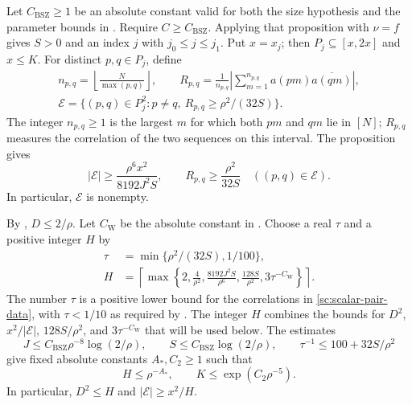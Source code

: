 \documentclass[twoside]{aomart}
\makeatletter
\theoremstyle{paperplain}
\theoremstyle{paperdefinition}
\renewenvironment{proof}[1][\proofname]{\par\pushQED{\qed}%
  \normalfont\topsep6\p@\@plus3\p@\relax\trivlist
  \item[\hskip\labelsep\itshape #1\@addpunct{.}]\ignorespaces
}{\popQED\endtrivlist\@endpefalse}
\numberwithin{equation}{section}
\makeatother
\begin{document}
\begin{proof}
Let $C_{\mathrm{BSZ}}\ge1$ be an absolute constant valid for both
the size hypothesis and the parameter bounds in .
Require $C\ge C_{\mathrm{BSZ}}$. Applying that proposition with
$\nu=f$ gives $S>0$ and an index $j$ with $j_0\le j\le j_1$.
Put $x=x_j$; then $P_j\subseteq[x,2x]$ and $x\le K$.
For distinct $p,q\in P_j$, define
\begin{equation*}
 \begin{gathered}
 n_{p,q}=\left\lfloor\frac{N}{\max(p,q)}\right\rfloor,\qquad
 R_{p,q}=\frac1{n_{p,q}}
       \left|\sum_{m=1}^{n_{p,q}}a(pm)\overline{a(qm)}\right|,\\
 \mathcal E=\{(p,q)\in P_j^2:p\ne q,\ R_{p,q}\ge\rho^2/(32S)\}.
 \end{gathered}
\end{equation*}
The integer $n_{p,q}\ge1$ is the largest $m$ for which both
$pm$ and $qm$ lie in $[N]$; $R_{p,q}$ measures the correlation
of the two sequences on this interval. The proposition gives
\begin{equation}
 |\mathcal E|\ge\frac{\rho^6x^2}{8192J^2S},
 \qquad R_{p,q}\ge\frac{\rho^2}{32S}
 \quad((p,q)\in\mathcal E).
 \label{sc:scalar-pair-data}
\end{equation}
In particular, $\mathcal E$ is nonempty.

By , $D\le2/\rho$.
Let $C_{\mathrm W}$ be the absolute constant in .
Choose a real $\tau$ and a positive integer $H$ by
\begin{equation}
 \begin{aligned}
 \tau&=\min\{\rho^2/(32S),1/100\},\\
 H&=\left\lceil\max\left\{
 2,\frac4{\rho^2},\frac{8192J^2S}{\rho^6},
 \frac{128S}{\rho^2},3\tau^{-C_{\mathrm W}}
 \right\}\right\rceil.
 \end{aligned}
 \label{sc:scalar-H-choice}
\end{equation}
The number $\tau$ is a positive lower bound for the correlations
in \eqref{sc:scalar-pair-data}, with $\tau<1/10$ as required by
. The integer $H$ combines the bounds for
$D^2$, $x^2/|\mathcal E|$, $128S/\rho^2$, and
$3\tau^{-C_{\mathrm W}}$ that will be used below.
The estimates
\[
 J\le C_{\mathrm{BSZ}}\rho^{-8}\log(2/\rho),\qquad
 S\le C_{\mathrm{BSZ}}\log(2/\rho),\qquad
 \tau^{-1}\le100+32S/\rho^2
\]
give fixed absolute constants $A_*,C_2\ge1$ such that
\begin{equation}
 H\le\rho^{-A_*},\qquad K\le\exp(C_2\rho^{-5}).
 \label{sc:scalar-H-growth}
\end{equation}
In particular, $D^2\le H$ and $|\mathcal E|\ge x^2/H$.


\end{proof}
\end{document}
